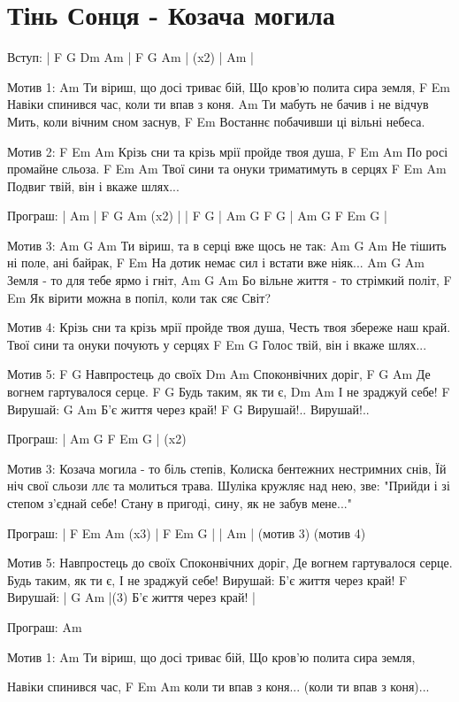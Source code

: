 \section{Тінь Сонця - Козача могила}
\begin{guitar}
Вступ: | F G Dm Am | F G Am | (x2)  | Am |

Мотив 1:
Am
   Ти віриш, що досі триває бій,
   Що кров'ю полита сира земля,
                           F              Em
   Навіки спинився час, коли ти впав з коня.
Am
   Ти мабуть не бачив і не відчув
   Мить, коли вічним сном заснув,
                          F          Em
   Востаннє побачивши ці вільні небеса.

Мотив 2:
           F            Em      Am
   Крізь сни та крізь мрії пройде твоя душа,
         F        Em     Am
   По росі промайне сльоза.
           F      Em      Am
   Твої сини та онуки триматимуть в серцях
            F           Em    Am
   Подвиг твій, він і вкаже шлях...

Програш: | Am | F G Am (x2) |
         | F G | Am G F G | Am G F Em G |

Мотив 3:
Am                           G       Am
   Ти віриш, та в серці вже щось не так:
Am                      G     Am
   Не тішить ні поле, ані байрак,
                           F         Em
   На дотик немає сил і встати вже ніяк...
Am                        G     Am
   Земля - то для тебе ярмо і гніт,
Am                            G     Am
   Бо вільне життя - то стрімкий політ,
                               F           Em
   Як вірити можна в попіл, коли так сяє Світ?

Мотив 4:
   Крізь сни та крізь мрії пройде твоя душа,
   Честь твоя збереже наш край.
   Твої сини та онуки почують у серцях
           F           Em    G
   Голос твій, він і вкаже шлях...

Мотив 5:
        F         G
Навпростець до своїх
       Dm       Am
Споконвічних доріг,
       F        G      Am
Де вогнем гартувалося серце.
        F         G
Будь таким, як ти є,
       Dm       Am
І не зраджуй себе!
     F
Вирушай:
        G         Am
Б'є життя через край!
     F          G
Вирушай!.. Вирушай!..

Програш: | Am G F Em G | (x2)


Мотив 3:
Козача могила - то біль степів,
Колиска бентежних нестримних снів,
Їй ніч свої сльози ллє та молиться трава.
Шуліка кружляє над нею, зве:
"Прийди і зі степом з'єднай себе!
Стану в пригоді, сину, як не забув мене..."

Програш: | F Em Am (x3) | F Em G |
         | Am |
         (мотив 3) (мотив 4)

Мотив 5:
Навпростець до своїх
Споконвічних доріг,
Де вогнем гартувалося серце.
Будь таким, як ти є,
І не зраджуй себе!
Вирушай:
Б'є життя через край!
     F
Вирушай:              |
        G         Am  |(3)
Б'є життя через край! |

Програш: Am

Мотив 1:
Am
   Ти віриш, що досі триває бій,
   Що кров'ю полита сира земля,

   Навіки спинився час,
      F              Em             Am
   коли ти впав з коня...
                 (коли ти впав з коня)...
\end{guitar}
